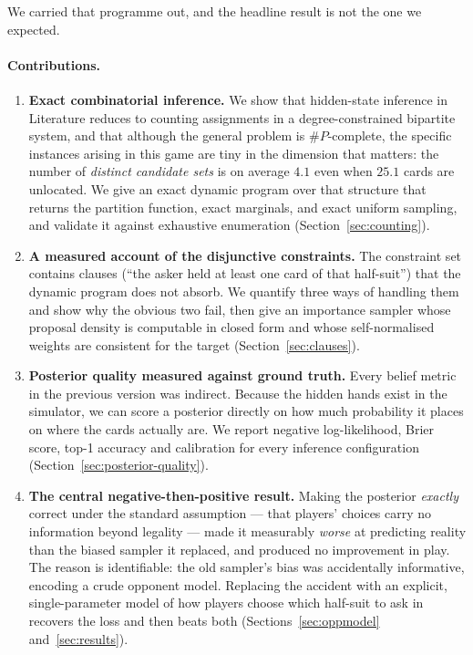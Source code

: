 \documentclass[11pt,a4paper]{article}
\begin{document}
We carried that programme out, and the headline result is not the one we
expected.

\paragraph{Contributions.}
\begin{enumerate}
\item \textbf{Exact combinatorial inference.} We show that hidden-state
inference in Literature reduces to counting assignments in a
degree-constrained bipartite system, and that although the general problem is
$\#P$-complete, the specific instances arising in this game are tiny in the
dimension that matters: the number of \emph{distinct candidate sets} is on
average $4.1$ even when $25.1$ cards are unlocated. We give an exact dynamic
program over that structure that returns the partition function, exact
marginals, and exact uniform sampling, and validate it against exhaustive
enumeration (Section~\ref{sec:counting}).

\item \textbf{A measured account of the disjunctive constraints.} The
constraint set contains clauses (``the asker held at least one card of that
half-suit'') that the dynamic program does not absorb. We quantify three ways
of handling them and show why the obvious two fail, then give an importance
sampler whose proposal density is computable in closed form and whose
self-normalised weights are consistent for the target
(Section~\ref{sec:clauses}).

\item \textbf{Posterior quality measured against ground truth.} Every belief
metric in the previous version was indirect. Because the hidden hands exist in
the simulator, we can score a posterior directly on how much probability it
places on where the cards actually are. We report negative log-likelihood,
Brier score, top-1 accuracy and calibration for every inference configuration
(Section~\ref{sec:posterior-quality}).

\item \textbf{The central negative-then-positive result.} Making the posterior
\emph{exactly} correct under the standard assumption --- that players' choices
carry no information beyond legality --- made it measurably \emph{worse} at
predicting reality than the biased sampler it replaced, and produced no
improvement in play. The reason is identifiable: the old sampler's bias was
accidentally informative, encoding a crude opponent model. Replacing the
accident with an explicit, single-parameter model of how players choose which
half-suit to ask in recovers the loss and then beats both
(Sections~\ref{sec:oppmodel} and~\ref{sec:results}).


\end{enumerate}
\end{document}
